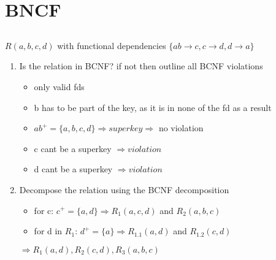 \documentclass{article}
\begin{document}
\section{BNCF}
\subsection*{} $R(a, b, c, d)$ with functional dependencies
    $\{ab \rightarrow c, c \rightarrow d, d \rightarrow a\}$
\begin{enumerate}
    \item Is the relation in BCNF? if not then outline all BCNF violations 
        \begin{itemize}
            \item only valid fds
            \item b has to be part of the key, as it is in none of the fd as a result
            \item $ab^{+} = \{a, b, c, d\} \Rightarrow superkey \Rightarrow$ no violation
            \item c cant be a superkey $\Rightarrow violation$
            \item d cant be a superkey $\Rightarrow violation$
        \end{itemize} 
    \item Decompose the relation using the BCNF decomposition
        \begin{itemize}
            \item for c: $c^{+} = \{a, d\} \Rightarrow R_{1}(a, c, d)$ and $R_{2}(a, b, c)$
            \item for d in $R_{1}$: $d^{+} = \{a\} \Rightarrow R_{1.1}(a, d)$ and $R_{1.2}(c, d)$
        \end{itemize}
    $\Rightarrow R_{1}(a, d), R_{2}(c, d), R_{3}(a, b, c)$
\end{enumerate}
\end{document}
